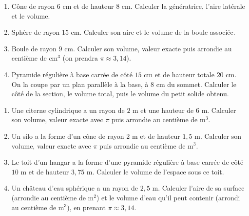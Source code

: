 \begin{enumerate}[label=\arabic*)]
\item Cône de rayon $6$ cm et de hauteur $8$ cm. Calculer la génératrice, l'aire latérale et
le volume.
\item Sphère de rayon $15$ cm. Calculer son aire et le volume de la boule associée.
\item Boule de rayon $9$ cm. Calculer son volume, valeur exacte puis arrondie au centième de
cm$^{3}$ (on prendra $\pi\approx3{,}14$).
\item Pyramide régulière à base carrée de côté $15$ cm et de hauteur totale $20$ cm. On la
coupe par un plan parallèle à la base, à $8$ cm du sommet. Calculer le côté de la section,
le volume total, puis le volume du petit solide obtenu.
\end{enumerate}

\begin{enumerate}[label=\arabic*)]
\item Une citerne cylindrique a un rayon de $2$ m et une hauteur de $6$ m. Calculer son
volume, valeur exacte avec $\pi$ puis arrondie au centième de m$^{3}$.
\item Un silo a la forme d'un cône de rayon $2$ m et de hauteur $1{,}5$ m. Calculer son
volume, valeur exacte avec $\pi$ puis arrondie au centième de m$^{3}$.
\item Le toit d'un hangar a la forme d'une pyramide régulière à base carrée de côté $10$ m
et de hauteur $3{,}75$ m. Calculer le volume de l'espace sous ce toit.
\item Un château d'eau sphérique a un rayon de $2{,}5$ m. Calculer l'aire de sa surface
(arrondie au centième de m$^{2}$) et le volume d'eau qu'il peut contenir (arrondi au
centième de m$^{3}$), en prenant $\pi\approx3{,}14$.
\end{enumerate}

